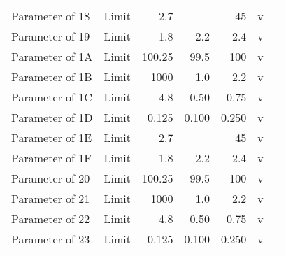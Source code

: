 \documentclass{article}
\begin{document}
\begin{ThreePartTable}
\begin{longtable}{p{5.5cm}lrrrlm{5.75cm}}
			Parameter of 18     & Limit         & 2.7       &           & 45        & v         &       \\
			Parameter of 19     & Limit         & 1.8       & 2.2       & 2.4       & v         &       \\
			Parameter of 1A     & Limit         & 100.25    & 99.5      & 100       & v         &       \\
			Parameter of 1B     & Limit         & 1000      & 1.0       & 2.2       & v         &       \\
			Parameter of 1C     & Limit         & 4.8       & 0.50      & 0.75      & v         &       \\
			Parameter of 1D     & Limit         & 0.125     & 0.100     & 0.250     & v         &       \\
			
			\newpage
			\toprule
			\ltsubcap{Current Limits}
			
			Parameter of 1E     & Limit     & 2.7       &           & 45        & v         &       \\
			Parameter of 1F     & Limit     & 1.8       & 2.2       & 2.4       & v         &       \\
			Parameter of 20     & Limit     & 100.25    & 99.5      & 100       & v         &       \\
			Parameter of 21     & Limit     & 1000      & 1.0       & 2.2       & v         &       \\
			Parameter of 22     & Limit     & 4.8       & 0.50      & 0.75      & v         &       \\
			Parameter of 23     & Limit     & 0.125     & 0.100     & 0.250     & v         &       \\
			
		\end{longtable}
	\end{ThreePartTable}
	
\end{document}
